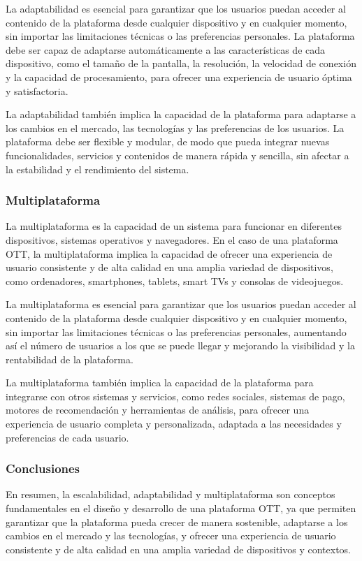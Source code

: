 La adaptabilidad es esencial para garantizar que los usuarios puedan acceder al contenido de la plataforma desde cualquier dispositivo
y en cualquier momento, sin importar las limitaciones técnicas o las preferencias personales. La plataforma debe ser capaz de adaptarse
automáticamente a las características de cada dispositivo, como el tamaño de la pantalla, la resolución, la velocidad de conexión y la
capacidad de procesamiento, para ofrecer una experiencia de usuario óptima y satisfactoria.

La adaptabilidad también implica la capacidad de la plataforma para adaptarse a los cambios en el mercado, las tecnologías y las
preferencias de los usuarios. La plataforma debe ser flexible y modular, de modo que pueda integrar nuevas funcionalidades, servicios
y contenidos de manera rápida y sencilla, sin afectar a la estabilidad y el rendimiento del sistema.

\subsubsection{Multiplataforma}
\label{subsec:fundamentos_teoricos_esc_adapt_multiplataforma}

La multiplataforma es la capacidad de un sistema para funcionar en diferentes dispositivos, sistemas operativos y navegadores. En el
caso de una plataforma OTT, la multiplataforma implica la capacidad de ofrecer una experiencia de usuario consistente y de alta calidad
en una amplia variedad de dispositivos, como ordenadores, smartphones, tablets, smart TVs y consolas de videojuegos.

La multiplataforma es esencial para garantizar que los usuarios puedan acceder al contenido de la plataforma desde cualquier dispositivo
y en cualquier momento, sin importar las limitaciones técnicas o las preferencias personales, aumentando así el número de usuarios a los que
se puede llegar y mejorando la visibilidad y la rentabilidad de la plataforma.

La multiplataforma también implica la capacidad de la plataforma para integrarse con otros sistemas y servicios, como redes sociales, sistemas
de pago, motores de recomendación y herramientas de análisis, para ofrecer una experiencia de usuario completa y personalizada, adaptada a las
necesidades y preferencias de cada usuario.

\subsubsection{Conclusiones}
\label{subsec:fundamentos_teoricos_esc_adapt_conclusiones}

En resumen, la escalabilidad, adaptabilidad y multiplataforma son conceptos fundamentales en el diseño y desarrollo de una plataforma OTT, ya
que permiten garantizar que la plataforma pueda crecer de manera sostenible, adaptarse a los cambios en el mercado y las tecnologías, y ofrecer
una experiencia de usuario consistente y de alta calidad en una amplia variedad de dispositivos y contextos.